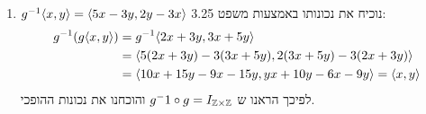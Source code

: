 \documentclass{article}
\begin{document}
\begin{enumerate}
\begin{enumerate}
\begin{proof}
\begin{align*}
				\boxed{n = 2b - 3a \ontop{(e)}\in \ZZ}
				\ontop{(d)}\Rightarrow
				2m + 3(2b - 3a) = a \\
				&\Rightarrow
				2m + 6b - 9a = a \Rightarrow
				2m = 10a - 6b \Rightarrow
				\boxed{m = 5a - 3b \ontop{(e)}\in \ZZ}
			\end{align*}
			הראנו כאן שגם $m \in \ZZ$ וגם $n \in \ZZ$ מכאן ש $\ang{m,n} \in \ZZ\times\ZZ$ שזה תחום הפונקציה, ועל כן לכל זוג סדור $\ang{a,b}$ בטווח הפונקציה, קיים זוג סדור $\ang{m,n}$ בתחומה כך ש $g\ang{m,n} = \ang{a,b}$. \\
			ולפיכך $g$ הינה פונקציה על.
		\end{proof}
	\end{enumerate}
	הוכחנו ש $g$ היא חד חד ערכית ועל, וע"כ לפי משפט 3.8 $g$ היא הפיכה. \\ \nl
	(a) - עפ"י הגדרת השוויון על אי זוגות סדורים. \\
	(b) - נכפיל את המשוואה הראשונה ב 3 והשניה ב 2. \\
	(c) - נחסר את המשוואות. \\
	(d) - נציב חזרה במשוואה הראשונה. \\
	(e) - התוצאה של חיסור מספרים שלמים הינה מספר שלם. \\
	\item $g^{-1}\langle x,y \rangle = \langle 5x-3y, 2y-3x \rangle$
	נוכיח את נכונותו באמצעות משפט 3.25:
	\begin{align*}
		g^{-1}(g\langle x,y \rangle) &= g^{-1}\langle 2x+3y, 3x + 5y \rangle \\
		&=\langle 5(2x+3y)-3(3x + 5y), 2(3x + 5y) - 3(2x+3y) \rangle \\
		&= \langle 10x+15y -9x -15y, yx + 10y -6x -9y \rangle =
		\langle x, y \rangle
	\end{align*}
	לפיכך הראנו ש $g^-1 \circ g = I_{\mathbb{Z} \times \mathbb{Z}}$ והוכחנו את נכונות ההופכי.
\end{enumerate}
\end{document}
